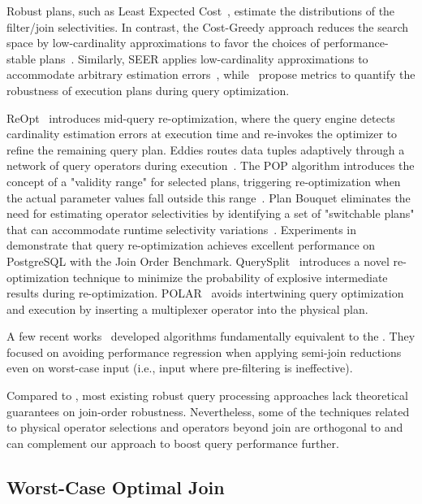 Robust plans, such as Least Expected Cost~\cite{2002LEC, 2005RCE}, estimate the distributions of the filter/join selectivities. In contrast, the Cost-Greedy approach reduces the search space by low-cardinality approximations to favor the choices of performance-stable plans~\cite{2007plan_diagram}. Similarly, SEER applies low-cardinality approximations to accommodate arbitrary estimation errors~\cite{2008strict_plan_diagram}, while~\cite{Abhirama2010BDSH, AlyoubiHW15, Wolf2018RobustMetric} propose metrics to quantify the robustness of execution plans during query optimization.

ReOpt~\cite{1998reopt, 1999reopt_shared_nothing} introduces mid-query re-optimization, where the query engine detects cardinality estimation errors at execution time and re-invokes the optimizer to refine the remaining query plan. Eddies routes data tuples adaptively through a network of query operators during execution~\cite{2000eddies}. The POP algorithm introduces the concept of a "validity range" for selected plans, triggering re-optimization when the actual parameter values fall outside this range~\cite{2004pop, 2007pop_parallel}. Plan Bouquet eliminates the need for estimating operator selectivities by identifying a set of "switchable plans" that can accommodate runtime selectivity variations~\cite{2016planbouquets}. Experiments in~\cite{Perron19} demonstrate that query re-optimization achieves excellent performance on PostgreSQL with the Join Order Benchmark. QuerySplit~\cite{2023reopt_zhao} introduces a novel re-optimization technique to minimize the probability of explosive intermediate results during re-optimization. POLAR~\cite{justen2024polar} avoids intertwining query optimization and execution by inserting a multiplexer operator into the physical plan.

A few recent works~\cite{birler2024robust, treetrackerjoin} developed algorithms fundamentally equivalent to the \YannAlg. They focused on avoiding performance regression when applying semi-join reductions even on worst-case input (i.e., input where pre-filtering is ineffective).

Compared to \rpt, most existing robust query processing approaches lack theoretical guarantees on join-order robustness. Nevertheless, some of the techniques related to physical operator selections and operators beyond join are orthogonal to \rpt and can complement our approach to boost query performance further.

\subsection{Worst-Case Optimal Join}


